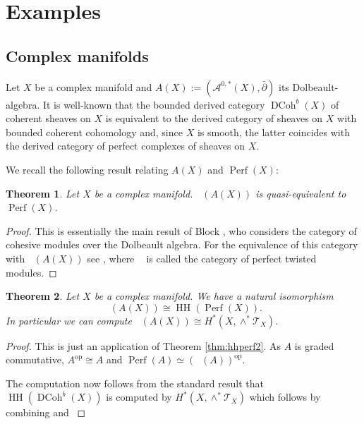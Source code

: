 \documentclass[a4paper]{amsart}
\theoremstyle{plain}
\newtheorem{thm}{Theorem}[section]
\theoremstyle{definition}
\theoremstyle{remark}
\DeclareMathOperator{\DCoh}{DCoh}
\DeclareMathOperator{\HH}{HH}
\DeclareMathOperator{\HHII}{HH^{\mathrm{II}}}
\DeclareMathOperator{\Perf}{Perf}
\DeclareMathOperator{\PerfII}{Perf^{\mathrm{II}}}
\newcommand{\op}{\mathrm{op}}
\numberwithin{equation}{section}
\theoremstyle{plain}
\begin{document}
	\section{Examples}\label{sect:examples}
	
	\subsection{Complex manifolds}
		Let $X$ be a complex manifold and $A(X):=(\mathcal{A}^{0,*}(X), \bar \partial)$ its Dolbeault-algebra. 
	It is well-known \cite{blo10, chl21} that the bounded derived category $\DCoh^b(X)$ of coherent sheaves on $X$ is equivalent to the derived category of sheaves on $X$ with bounded  coherent cohomology and, since $X$ is smooth, the latter coincides with the derived category of perfect complexes of sheaves on $X$. 
		
		We recall the following result relating $A(X)$ and $\Perf(X)$:
	\begin{thm}\label{thm:perfiidolbeault}
		Let $X$ be a complex manifold.
		$\PerfII(A(X))$ is quasi-equivalent to $\Perf(X)$.
	\end{thm}
	\begin{proof}
		This is essentially the main result of Block \cite{blo10}, who considers the category of cohesive modules over the Dolbeault algebra. For the equivalence of this category with $\PerfII(A(X))$ see \cite[Corollary 3.1]{Holstein5}, where $\PerfII$ is called the category of perfect twisted modules.
	\end{proof}
	
	\begin{thm}\label{thm:hhdolbeault}
		Let $X$ be a complex manifold. We have a natural isomorphism
		\[
		\HHII(A(X))\cong \HH(\Perf(X)).
		\]
		In particular we can compute $\HHII(A(X)) \cong H^*(X, \wedge^* \mathcal T_X)$.
	\end{thm}
	\begin{proof}
		This is just an application of Theorem \ref{thm:hhperf2}.
		As $A$ is graded commutative, $A^\op\cong A$ and $\Perf(A)\simeq (\PerfII(A))^\op$.
		
		The computation now follows from the standard result that $\HH(\DCoh^b(X))$ is computed by $H^*(X, \wedge^* \mathcal T_X)$ which follows by combining \cite[Corollary 4.2]{calduararu2005mukai} and \cite[Corollary 8.12]{toen2007homotopy}
	\end{proof}	
	
\end{document}
